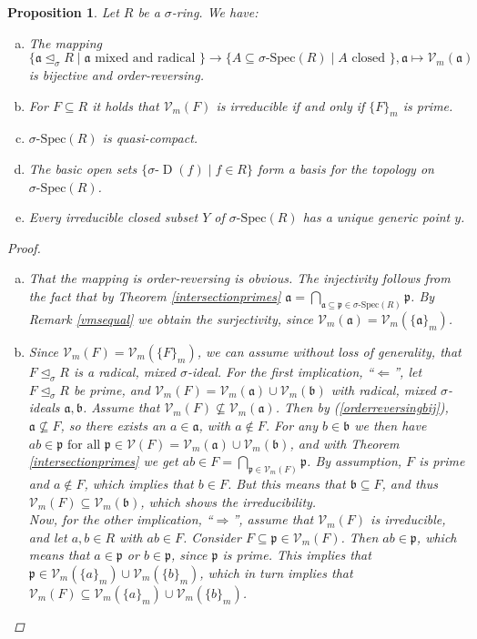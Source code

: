 \documentclass{article}
\def\Vm{\mathcal{V}_m}
\def\V{\mathcal{V}}
\def\a{\mathfrak{a}}
\def\b{\mathfrak{b}}
\def\p{\mathfrak{p}}
\def\s{\sigma}
\def\si{\unlhd_{\sigma}}
\def\sD{\s\text{-}\operatorname{D}}
\def\sSpec{\sigma\text{-Spec}}
\def\fa{\text{ for all }}
\newenvironment{bew}{\begin{proof}[Proof]}{\end{proof}}
\theoremstyle{plain}
\newtheorem{prop}[Satz]{Proposition}
\theoremstyle{definition}
\begin{document}
\begin{prop}
Let $R$ be a $\s$-ring. We have:
\begin{enumerate}[(a)]
\item \label{vmbijection} The mapping 
$$\{ \a \si R \mid \a\text{ mixed and radical }\} \rightarrow \{ A \subseteq \sSpec(R) \mid A \text{ closed }\}, \a \mapsto \Vm(\a)$$
 is bijective and order-reversing.
\item \label{irred=prime} For $F \subseteq R$ it holds that $\Vm(F)$ is irreducible if and only if $\{F\}_m$ is prime.
\item $\sSpec(R)$ is quasi-compact.
\item The basic open sets $\{ \sD(f) \mid f \in R \}$ form a basis for the topology on $\sSpec(R)$.
\item Every irreducible closed subset $Y$ of $\sSpec(R)$ has a unique generic point $y$.
\end{enumerate}
\clearpage %
\begin{bew} $~$
\begin{enumerate}[(a)]
\item \label{orderreversingbij} That the mapping is order-reversing is obvious. The injectivity follows from the fact that by Theorem \ref{intersectionprimes} $\a = \bigcap_{\a \subseteq \p \in \sSpec(R)} \p$. By Remark \ref{vmsequal} we obtain the surjectivity,
 since $\Vm(\a) = \Vm(\{\a\}_m)$.
\item Since $\Vm(F) = \Vm(\{F\}_m)$, we can assume without loss of generality, that $F \si R$ is a radical, mixed $\s$-ideal.
For the first implication, ``$\Leftarrow$'', let $F \si R$ be prime, and $\Vm(F) = \Vm(\a) \cup \Vm(\b)$ with radical, mixed $\s$-ideals $\a, \b$. Assume that $\Vm(F) \not\subseteq \Vm(\a)$. Then by (\ref{orderreversingbij}), $\a \not \subseteq F$, so there exists an $a \in \a$, with $a \notin F$.
For any $b \in \b$ we then have $ab \in \p \fa \p \in \V(F) = \Vm(\a) \cup \Vm(\b)$, and with Theorem \ref{intersectionprimes} we get $ab \in F = \bigcap_{\p \in \Vm(F)}\p$. By assumption, $F$ is prime and $a \notin F$, which implies
 that  $b \in F$. But this means that $\b \subseteq F$, and thus $\Vm(F) \subseteq \Vm(\b)$, which shows the irreducibility. \\
\indent Now, for the other implication, ``$\Rightarrow$'', assume that $\Vm(F)$ is irreducible, and let $a,b \in R$ with $ab \in F$. Consider $F \subseteq \p \in \Vm(F)$. Then $ab \in \p$, 
which means that $a \in \p$ or $b \in \p$, since $\p$ is prime. This implies that $\p \in \Vm(\{a\}_m) \cup \Vm(\{b\}_m)$, which in turn implies that $\Vm(F) \subseteq \Vm(\{a\}_{m}) \cup \Vm(\{b\}_{m})$.

\end{enumerate}
\end{bew}
\end{prop}
\end{document}
